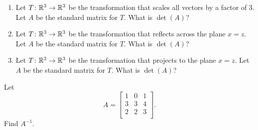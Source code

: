 \documentclass[12pt,letterpaper]{article}
\begin{document}
\begin{enumerate}
\Problem 
\begin{enumerate}	
\item		Let $T\colon \mathbb{R}^3 \rightarrow \mathbb{R}^3$ be the transformation that scales all vectors by a factor of 3.
Let $A$ be the standard matrix for $T$.  What is $\det(A)$?
\item Let $T\colon \mathbb{R}^3 \rightarrow \mathbb{R}^3$ be the transformation that reflects across the plane $x=z$.
Let $A$ be the standard matrix for $T$.  What is $\det(A)$?
\item Let $T\colon \mathbb{R}^3 \rightarrow \mathbb{R}^3$ be the transformation that projects to the plane $x=z$.
Let $A$ be the standard matrix for $T$. What is $\det(A)$?
\end{enumerate}

\Problem Let \begin{equation*}
A=\begin{bmatrix}
1 & 0 & 1\\
3 & 3 & 4\\
2 & 2 & 3\\
\end{bmatrix}.
\end{equation*}  Find $A^{-1}$.


\end{enumerate}
\end{document}
